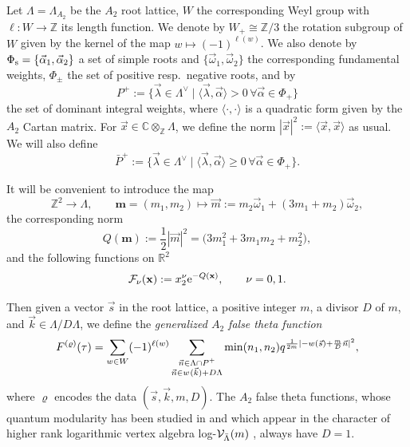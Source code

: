 \documentclass[pdftex]{sigma}
\def\be{\begin{equation}} \def\ee{\end{equation}}
\def\BR{\mathbb{R}}
\newcommand{\ZZ}{\mathbb{Z}}
\def\bos{\varrho}
\theoremstyle{definition}
\numberwithin{equation}{section}
\begin{document}
Let $\Lambda=\Lambda_{A_2}$ be the $A_2$ root lattice, $W$ the corresponding Weyl group with $\ell\colon W \to \ZZ$ its length function. We denote by $W_+\cong \ZZ/3$ the rotation subgroup of $W$ given by the kernel of the map $w\mapsto (-1)^{\ell(w)}$. We also denote by $\Phi_{\rm s}=\{\vec \alpha_1, \vec \alpha_2\}$ a set of simple roots and $\{\vec \omega_1, \vec \omega_2\}$ the corresponding fundamental weights, $\Phi_\pm$ the set of positive resp.\ negative roots, and by
\be
\label{eqn:P+}
P^+:=\bigl\{\vec \lambda \in \Lambda^\vee
\mid \langle \vec \lambda, \vec \alpha\rangle {>} 0\, \forall \vec\alpha \in \Phi_+
\bigr\}
\ee
the set of dominant integral weights, where $\langle \cdot, \cdot \rangle$ is a quadratic form given by the $A_2$ Cartan matrix. For $\vec{x} \in \mathbb{C} \otimes_\mathbb{Z} \Lambda $, we define the norm $| \vec{x} |^2 := \langle \vec{x}, \vec{x} \rangle$ as usual. We will also define
\be
\label{eqn:barP+}
\bar P^+:=\bigl\{\vec \lambda \in \Lambda^\vee
\mid \langle \vec \lambda, \vec \alpha\rangle \geq 0 \, \forall \vec\alpha \in \Phi_+
\bigr\} .
\ee

It will be convenient to introduce the map
\[
\ZZ^2 \to \Lambda, \qquad \mathbf{m}= (m_1,m_2)\mapsto \vec {m} :=m_2 \vec\omega_1 + (3m_1+m_2)\vec \omega_2 ,
\]
the corresponding norm
\begin{equation}\label{def:quadraticformQx}
	Q(\mathbf{m}):= \frac{1}{2}|\vec { m}|^2=\bigl(3m_{1}^2+3m_1m_2+m_2^2\bigr),
\end{equation}
and the following functions on $\BR^2$
\begin{gather}\label{dfn:Fcalnu-O}
	\mathcal{F}_{\nu}( \mathbf{x} ):=x_2^\nu {\rm e}^{-Q( \mathbf{x} )}, \qquad\nu=0,1.
\end{gather}

Then given a vector $\vec s$ in the root lattice, a positive integer $m$, a divisor $D$ of $m$, and $\vec k\in \Lambda/ D\Lambda$, we define the {\em generalized $A_2$ false theta function}
\be\label{dfn:gen_false}
F^{(\bos)} (\tau) = \sum_{w\in W} (-1)^{\ell(w)} \sum_{\substack{ \vec n\in \Lambda \cap P^+\\ \vec n \in w^{}(\vec k ) + D\Lambda}} {\rm min}(n_1,n_2) q^{\frac{1}{2m} |-w(\vec s) + \frac{m}{D} \vec n|^2},
\ee
where $\bos$ encodes the data
$(\vec{s},\vec{k},m,D)$.
The $A_2$ false theta functions, whose quantum modularity has been studied in \cite{bringmann2018higher} and which appear in the character of higher rank logarithmic vertex algebra {log-${\cal V}_{\bar \Lambda}(m)$} \cite{feigin2010logarithmic}, always have $D=1$.
\end{document}
